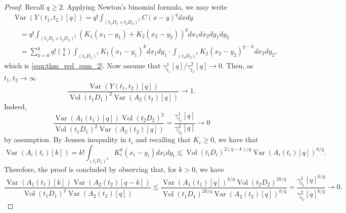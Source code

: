 \documentclass[12pt]{article}
\DeclareMathOperator{\var}{Var}
\DeclareMathOperator{\1}{1}
\DeclareMathOperator{\vol}{Vol}
\theoremstyle{plain}
\theoremstyle{definition}
\begin{document}
\begin{proof} Recall $q\ge2$. Applying Newton's binomial formula, we may write
        \begin{align}
        & \var(Y(t_1,{t_2})[q])  = q! \int_{({t_1}D_1\times {t_2}D_2)^2} C(x-y)^q dxdy \\
        &\quad = q! \int_{(t_1D_1\times t_2D_2)^2} (K_1(x_1-y_1)+K_2(x_2-y_2))^q dx_1dx_2dy_1dy_2 \\
        &\quad = \sum_{k=0}^q q! \binom{q}{k}\int_{(t_1D_1)^2} K_1(x_1-y_1)^kdx_1dy_1\cdot \int_{( t_2D_2)^2}K_2(x_2-y_2)^{q-k} dx_2dy_2,
        \end{align}
        which is \eqref{equ:thm_red_sum_2}.
        Now assume that $\gamma^1_{t_1}[q]/\gamma^2_{t_2}[q]\rightarrow 0$. Then, as $t_1, t_2\rightarrow\infty$  \begin{equation*}
        \frac{\var(Y(t_1,t_2)[q])}{\vol(t_1D_1)^2 \var(A_2(t_2)[q])} \longrightarrow 1.
    \end{equation*}
    Indeed, \begin{equation*}
         \frac{\var(A_1(t_1)[q])\vol(t_2D_2)^2}{\vol(t_1D_1)^2  \var(A_2(t_2)[q])}=\frac{\gamma^1_{t_1}[q]}{\gamma^2_{t_2}[q]}\longrightarrow 0
    \end{equation*} 
    by assumption.
    By Jensen inequality in $t_i$ and recalling that $K_i\ge0$, we have that 
    \begin{equation}
        \var(A_i(t_i)[k]) =  k!\int_{(t_iD_i)^2}K_i^k(x_i-y_i)dx_idy_i
         \lesssim  \vol(t_iD_i)^{2(q-k)/q}\var(A_i({t_i})[q])^{k/q}.
    \end{equation}
    Therefore, the proof is concluded by observing that, for $k>0$, we have
    \begin{equation}
    \frac{\var(A_1(t_1)[k])\var(A_2(t_2)[q-k])}{\vol(t_1D_1)^2  \var(A_2(t_2)[q])} \lesssim \frac{\var(A_1(t_1)[q])^{k/q}\vol(t_2D_2)^{2k/q}}{\vol(t_1D_1)^{2k/q}\var(A_2(t_2)[q])^{k/q}} =\frac{\gamma^1_{t_1}[q]^{k/q}}{\gamma^2_{t_2}[q]^{k/q}}\longrightarrow 0.
    \end{equation}
    \end{proof}
\end{document}
